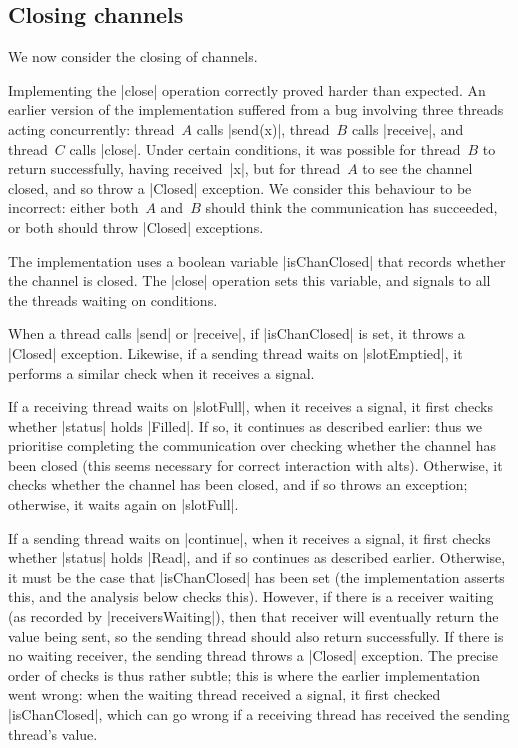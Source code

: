 \subsection{Closing channels}

\inlineScala

We now consider the closing of channels.  

Implementing the |close| operation correctly proved harder than expected.  An
earlier version of the implementation suffered from a bug involving three
threads acting concurrently: thread~$A$ calls |send(x)|, thread~$B$ calls
|receive|, and thread~$C$ calls |close|.  Under certain conditions, it was
possible for thread~$B$ to return successfully, having received~|x|, but for
thread~$A$ to see the channel closed, and so throw a |Closed| exception.  We
consider this behaviour to be incorrect: either both~$A$ and~$B$ should think
the communication has succeeded, or both should throw |Closed| exceptions.


The implementation uses a boolean variable |isChanClosed| that records whether
the channel is closed.  The |close| operation sets this variable, and signals
to all the threads waiting on conditions.

When a thread calls |send| or |receive|, if |isChanClosed| is set, it throws a
|Closed| exception.  Likewise, if a sending thread waits on |slotEmptied|, it
performs a similar check when it receives a signal.  

If a receiving thread waits on |slotFull|, when it receives a signal, it first
checks whether |status| holds |Filled|.  If so, it continues as described
earlier: thus we prioritise completing the communication over checking whether
the channel has been closed (this seems necessary for correct interaction with
alts).
Otherwise, it checks whether the channel has been closed, and if so throws an
exception; otherwise, it waits again on |slotFull|.

If a sending thread waits on |continue|, when it receives a signal, it 
first checks whether |status| holds |Read|, and if so continues as described
earlier.  Otherwise, it must be the case that |isChanClosed| has been set (the
implementation asserts this, and the analysis below checks this).  However, if
there is a receiver waiting (as recorded by |receiversWaiting|), then that
receiver will eventually return the value being sent, so the sending thread
should also return successfully.  If there is no waiting receiver, the sending
thread throws a |Closed| exception.  The precise order of checks is thus
rather subtle; this is where the earlier implementation went wrong: when the
waiting thread received a signal, it first checked |isChanClosed|, which can
go wrong if a receiving thread has received the sending thread's value. 


